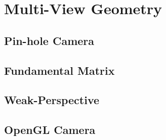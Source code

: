 \chapter{Multi-View Geometry}
\section{Pin-hole Camera}
\section{Fundamental Matrix}
\section{Weak-Perspective}
\section{OpenGL Camera}
